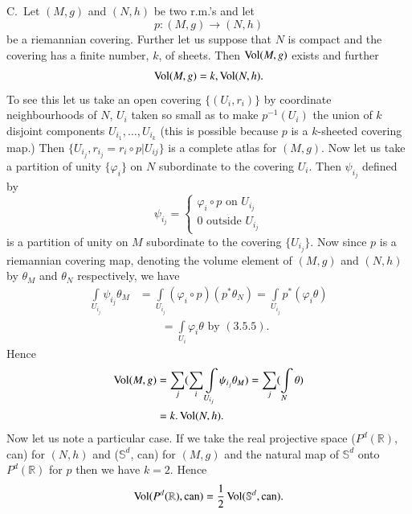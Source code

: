 \subsection{}\label{chap3:3.5.6}\pageoriginale

C.~Let $(M,g)$ and $(N,h)$ be two r.m.'s and let
$$
p:(M,g)\to (N,h)
$$
be a riemannian covering. Further let us suppose that $N$ is compact
and the covering has a finite number, $k$, of sheets. Then $\operatorname{Vol}(M,g)$
exists and further
$$
\operatorname{Vol}(M,g)=k,\operatorname{Vol}(N,h).
$$
To see this let us take an open covering $\{(U_{i},r_{i})\}$ by
coordinate neighbourhoods of $N$, $U_{i}$ taken so small as to make
$p^{-1}(U_{i})$ the union of $k$ disjoint components
$U_{i_{1}},\ldots,U_{i_{k}}$ (this is possible because $p$ is a
$k$-sheeted covering map.) Then $\{U_{i_{j}},r_{i_{j}}=r_{i}\circ
p|U_{ij}\}$ is a complete atlas for $(M,g)$. Now let us take a
partition of unity $\{\varphi_{i}\}$ on $N$ subordinate to the
covering $U_{i}$. Then $\psi_{i_{j}}$ defined by
$$
\psi_{i_{j}}=
\begin{cases}
\varphi_{i}\circ p\text{ \  on \ } U_{i_{j}}\\
0\text{ \ outside \ } U_{i_{j}}
\end{cases}
$$
is a partition of unity on $M$ subordinate to the covering
$\{U_{i_{j}}\}$. Now since $p$ is a riemannian covering map, denoting
the volume element of $(M,g)$ and $(N,h)$ by $\theta_{M}$ and
$\theta_{N}$ respectively, we have
\begin{align*}
\int\limits_{U_{i_{j}}}\psi_{i_{j}}\theta_{M} &=
\int\limits_{U_{i_{j}}}(\varphi_{i}\circ
p)(p^{\ast}\theta_{N})=\int\limits_{U_{i_{j}}}p^{\ast}(\varphi_{i}\theta)\\
&\qquad =\int\limits_{U_{i}}\varphi_{i}\theta\text{ by } (3.5.5).
\end{align*}
Hence\pageoriginale
\begin{align*}
\operatorname{Vol}(M,g) &=
\sum_{j}(\sum_{i}\int\limits_{U_{i_{j}}}\psi_{i_{j}}\theta_{M})=\sum_{j}(\int\limits_{N}\theta)\\
&= k.\operatorname{Vol}(N,h).
\end{align*}
Now let us note a particular case. If we take the real projective
space ($P^{d}(\mathbb{R})$, can) for $(N,h)$ and ($\mathbb{S}^{d}$,
can) for $(M,g)$ and the natural map of $\mathbb{S}^{d}$ onto
$P^{d}(\mathbb{R})$ for $p$ then we have $k=2$. Hence
$$
\operatorname{Vol}(P^{d}(\mathbb{R}),\operatorname{can})=\frac{1}{2}\operatorname{Vol}(\mathbb{S}^{d},\operatorname{can}).
$$

